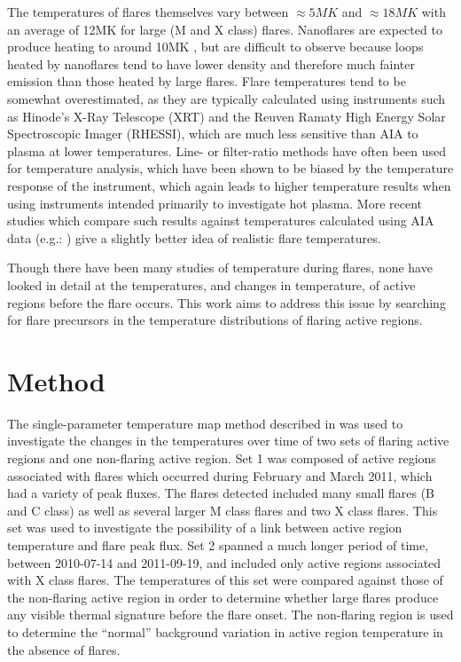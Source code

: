 \documentclass[namedreferences]{solarphysics}
\begin{document}
The temperatures of flares themselves vary between $\approx5MK$ and $\approx18MK$ with an average of 12MK for large (M and X class) flares.
Nanoflares are expected to produce heating to around 10MK \citep{Reale2011a}, but are difficult to observe because loops heated by nanoflares tend to have lower density and therefore much fainter emission than those heated by large flares.
Flare temperatures tend to be somewhat overestimated, as they are typically calculated using instruments such as Hinode's X-Ray Telescope (XRT) and the Reuven Ramaty High Energy Solar Spectroscopic Imager (RHESSI), which are much less sensitive than AIA to plasma at lower temperatures.
Line- or filter-ratio methods have often been used for temperature analysis, which have been shown to be biased by the temperature response of the instrument, which again leads to higher temperature results when using instruments intended primarily to investigate hot plasma.
More recent studies which compare such results against temperatures calculated using AIA data (e.g.: \citet{Ryan2013,Ryan2014}) give a slightly better idea of realistic flare temperatures.

Though there have been many studies of temperature during flares, none have looked in detail at the temperatures, and changes in temperature, of active regions before the flare occurs.
This work aims to address this issue by searching for flare precursors in the temperature distributions of flaring active regions.


\section{Method}

The single-parameter temperature map method described in \cite{Leonard} was used to investigate the changes in the temperatures over time of two sets of flaring active regions and one non-flaring active region.
Set 1 was composed of active regions associated with flares which occurred during February and March 2011, which had a variety of peak fluxes.
The flares detected included many small flares (B and C class) as well as several larger M class flares and two X class flares.
This set was used to investigate the possibility of a link between active region temperature and flare peak flux.
Set 2 spanned a much longer period of time, between 2010-07-14 and 2011-09-19, and included only active regions associated with X class flares.
The temperatures of this set were compared against those of the non-flaring active region in order to determine whether large flares produce any visible thermal signature before the flare onset.
The non-flaring region is used to determine the ``normal'' background variation in active region temperature in the absence of flares.
\end{document}
